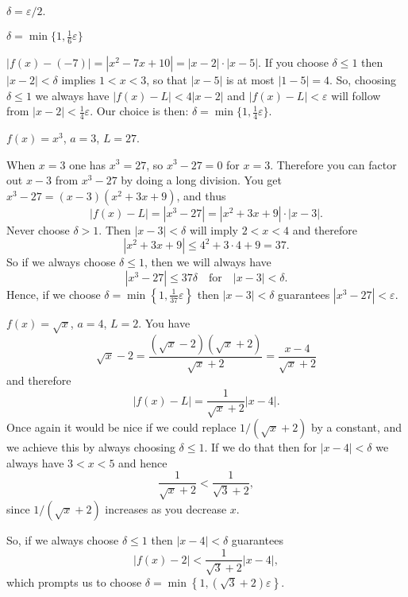 \item[{\bfseries(III4.4)}]

$\delta = \varepsilon/2$.
\bigskip

\item[{\bfseries(III4.5)}]

$\delta = \min \bigl\{1, \frac16\varepsilon\bigr\}$
\bigskip

\item[{\bfseries(III4.6)}]

$|f(x) - (-7) |=|x^2-7x+10| = |x-2|\cdot|x-5| $.  If you choose
$\delta\leq 1$ then $|x-2|<\delta$ implies $1<x<3$, so that $|x-5|$
is at most $|1-5| = 4$.
So, choosing $\delta\leq 1$ we always have $|f(x) - L|<4|x-2|$ and
$|f(x) - L|<\varepsilon$ will follow from $|x-2|<\frac14\varepsilon$.
Our choice is then: $\delta = \min \bigl\{1, \frac14\varepsilon
\bigr\}$.
\bigskip

\item[{\bfseries(III4.7)}]
 $f(x) = x^3$, $a=3$, $L=27$.

When $x=3$ one has $x^3=27$, so $x^3-27=0$ for $x=3$.  Therefore you
can factor out $x-3$ from $x^3-27$ by doing a long division.  You get
$x^3-27 = (x-3)(x^2+3x+9)$, and thus
\[
|f(x) - L| = |x^3-27| =|x^2+3x+9|\cdot|x-3|.
\]
Never choose $\delta>1$.  Then $|x-3|<\delta$ will imply $2<x<4$ and
therefore
\[
|x^2+3x+9| \leq 4^2+3\cdot4+9 = 37.
\]
So if we always choose $\delta\leq 1$, then we will always have
\[
|x^3-27|\leq 37\delta \quad\text{for}\quad |x-3|<\delta.
\]
Hence, if we choose $\delta=\min\left\{ 1, \tfrac1{37}\varepsilon
\right\}$ then $|x-3|<\delta$ guarantees $|x^3-27| < \varepsilon$.


\bigskip

\item[{\bfseries(III4.9)}]

$f(x) = \sqrt x$, $a=4$, $L=2$.
You have
\[
\sqrt x - 2 = \frac{(\sqrt x-2)(\sqrt x +2)}{\sqrt x +2}
=\frac{x-4}{\sqrt x+2}
\]
and therefore
\begin{equation}\label{eq:03sol-fx-L-estimate}
  |f(x) - L | = \frac{1}{\sqrt x+2}|x-4|.
\end{equation}
Once again it would be nice if we could replace $1/(\sqrt x + 2)$ by
a constant, and we achieve this by always choosing $\delta\leq 1$.
If we do that then for $|x-4|<\delta$ we always have $3<x<5$ and
hence
\[
\frac{1}{\sqrt x+2} < \frac{1}{\sqrt 3 +2},
\]
since $1/(\sqrt x+ 2)$ increases as you decrease $x$.

So, if we always choose $\delta\leq 1$ then $|x-4|<\delta$ guarantees
\[
|f(x)-2| < \frac1{\sqrt3 +2}|x-4|,
\]
which prompts us to choose $\delta = \min\left\{ 1, (\sqrt
  3+2)\varepsilon \right\}$.

